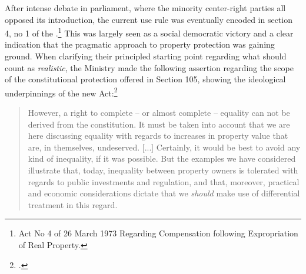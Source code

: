 
%

After intense debate in parliament, where the minority center-right parties all opposed its introduction, the current use rule was eventually encoded in section 4, no 1 of the \cite{ca73}.\footnote{Act No 4 of 26 March 1973 Regarding Compensation following Expropriation of Real Property.} This was largely seen as a social democratic victory and a clear indication that the pragmatic approach to property protection was gaining ground. When clarifying their principled starting point regarding what should count as \emph{realistic}, the Ministry made the following assertion regarding the scope of the constitutional protection offered in Section 105, showing the ideological underpinnings of the new Act:\footcite[17]{otprp70}

\begin{quote}
However, a right to complete -- or almost complete -- equality can not be derived from the constitution. It must be taken into account that we are here discussing equality with regards to increases in property value that are, in themselves, undeserved. [...]  %
Certainly, it would be best to avoid any kind of inequality, if it was possible. But the examples we have considered illustrate that, today, inequality between property owners is tolerated with regards to public investments and regulation, and that, moreover, practical and economic considerations dictate that we \emph{should} make use of differential treatment in this regard.
\end{quote}

